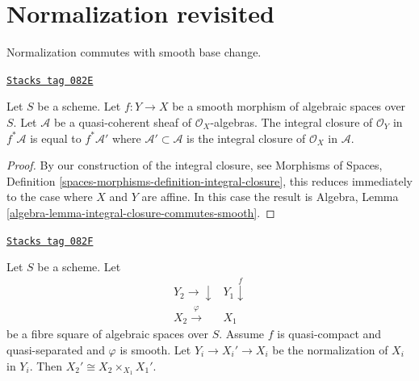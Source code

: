 \section{Normalization revisited}
\label{spaces-more-morphisms-section-normalization}
Normalization commutes with smooth base change.

\begin{lemma}
\label{spaces-more-morphisms-lemma-integral-closure-smooth-pullback}
\href{https://stacks.math.columbia.edu/tag/082E}{\texttt{Stacks tag 082E}}

Let $S$ be a scheme. Let $f : Y \to X$ be a smooth morphism of
algebraic spaces over $S$. Let $\mathcal{A}$ be a quasi-coherent
sheaf of $\mathcal{O}_X$-algebras. The integral closure
of $\mathcal{O}_Y$ in $f^*\mathcal{A}$ is equal to $f^*\mathcal{A}'$
where $\mathcal{A}' \subset \mathcal{A}$ is the integral closure of
$\mathcal{O}_X$ in $\mathcal{A}$.
\end{lemma}

\begin{proof}
By our construction of the integral closure, see
Morphisms of Spaces, Definition
\ref{spaces-morphisms-definition-integral-closure},
this reduces immediately to the case where $X$ and $Y$ are affine.
In this case the result is
Algebra, Lemma \ref{algebra-lemma-integral-closure-commutes-smooth}.
\end{proof}

\begin{lemma}

\label{spaces-more-morphisms-lemma-normalization-smooth-localization}
\href{https://stacks.math.columbia.edu/tag/082F}{\texttt{Stacks tag 082F}}

Let $S$ be a scheme. Let
$$
\begin{array}{cc}Y_2 \longrightarrow\downarrow & Y_1 \overset{f}{\downarrow} \\ X_2 \overset{\varphi}{\longrightarrow} & X_1\end{array}
$$
be a fibre square of algebraic spaces over $S$. Assume $f$ is quasi-compact
and quasi-separated and $\varphi$ is smooth.
Let $Y_i \to X_i' \to X_i$ be the normalization of $X_i$ in $Y_i$.
Then $X_2' \cong X_2 \times_{X_1} X_1'$.
\end{lemma}


